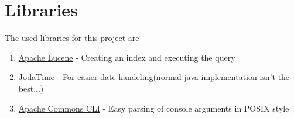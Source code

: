 \documentclass{scrartcl}
\begin{document}
\section{Libraries}
The used libraries for this project are

\begin{enumerate}
	\item \href{http://lucene.apache.org/}{Apache Lucene} - Creating an index and executing the query
	\item \href{http://www.joda.org/joda-time/}{JodaTime} - For easier date handeling(normal java implementation isn't the best...)
	\item \href{http://commons.apache.org/proper/commons-cli/}{Apache Commons CLI} - Easy parsing of console arguments in POSIX style
\end{enumerate}

\end{document}
